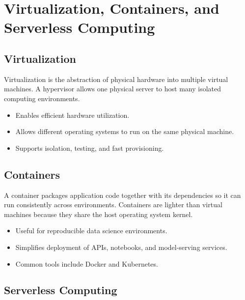 \documentclass[11pt,a4paper]{article}
\begin{document}
\section{Virtualization, Containers, and Serverless Computing}

\subsection{Virtualization}

\begin{definitionbox}[Virtualization]
Virtualization is the abstraction of physical hardware into multiple virtual machines. A hypervisor allows one physical server to host many isolated computing environments.
\end{definitionbox}

\begin{itemize}[leftmargin=*]
  \item Enables efficient hardware utilization.
  \item Allows different operating systems to run on the same physical machine.
  \item Supports isolation, testing, and fast provisioning.
\end{itemize}

\subsection{Containers}

\begin{definitionbox}[Container]
A container packages application code together with its dependencies so it can run consistently across environments. Containers are lighter than virtual machines because they share the host operating system kernel.
\end{definitionbox}

\begin{itemize}[leftmargin=*]
  \item Useful for reproducible data science environments.
  \item Simplifies deployment of APIs, notebooks, and model-serving services.
  \item Common tools include Docker and Kubernetes.
\end{itemize}

\subsection{Serverless Computing}
\end{document}
